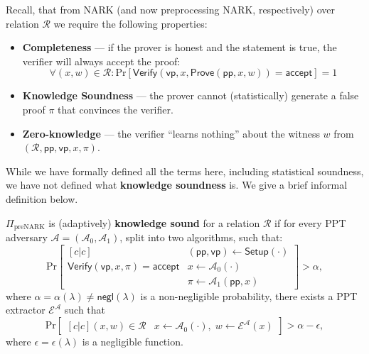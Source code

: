 \documentclass[../lecture-notes.tex]{subfiles}
\begin{document}
Recall, that from NARK (and now preprocessing NARK, respectively) over relation $\mathcal{R}$ we require the following properties:
\begin{itemize}
    \item \textbf{Completeness} --- if the prover is honest and the statement is true, the verifier will always accept the proof:
    \begin{equation*}
        \forall (x,w) \in \mathcal{R}: \text{Pr}[\mathsf{Verify}(\mathsf{vp}, x, \mathsf{Prove}(\mathsf{pp},x,w)) = \mathsf{accept}] = 1
    \end{equation*}
    \item \textbf{Knowledge Soundness} --- the prover cannot (statistically) generate a false proof $\pi$ that convinces the verifier. 
    \item \textbf{Zero-knowledge} --- the verifier ``learns nothing'' about the witness $w$ from $(\mathcal{R},\mathsf{pp},\mathsf{vp},x,\pi)$.
\end{itemize}

While we have formally defined all the terms here, including statistical soundness, we have not defined what \textbf{knowledge soundness} is. We give a brief informal definition below.

\begin{definition}
    $\Pi_{\text{preNARK}}$ is (adaptively) \textbf{knowledge sound} for a relation $\mathcal{R}$ if for every PPT adversary $\mathcal{A}=(\mathcal{A}_0,\mathcal{A}_1)$, split into two algorithms, such that:
    \begin{equation*}
        \text{Pr}\begin{bmatrix}[c|c]
            & (\mathsf{pp},\mathsf{vp}) \gets \mathsf{Setup}(\cdot)\\
            \mathsf{Verify}(\mathsf{vp},x,\pi)=\mathsf{accept} & x \gets \mathcal{A}_0(\cdot)  \\
            & \pi \gets \mathcal{A}_1(\mathsf{pp},x)
        \end{bmatrix} > \alpha,
    \end{equation*}
    where $\alpha=\alpha(\lambda) \neq \mathsf{negl}(\lambda)$ is a non-negligible probability, there exists a PPT extractor $\mathcal{E}^{\mathcal{A}}$ such that
    \begin{equation*}
        \text{Pr}\begin{bmatrix}[c|c]
            (x,w) \in \mathcal{R} & x \gets \mathcal{A}_0(\cdot), \; w \gets \mathcal{E}^{\mathcal{A}}(x)
        \end{bmatrix} > \alpha - \epsilon,
    \end{equation*}
    where $\epsilon = \epsilon(\lambda)$ is a negligible function.
\end{definition}
\end{document}
